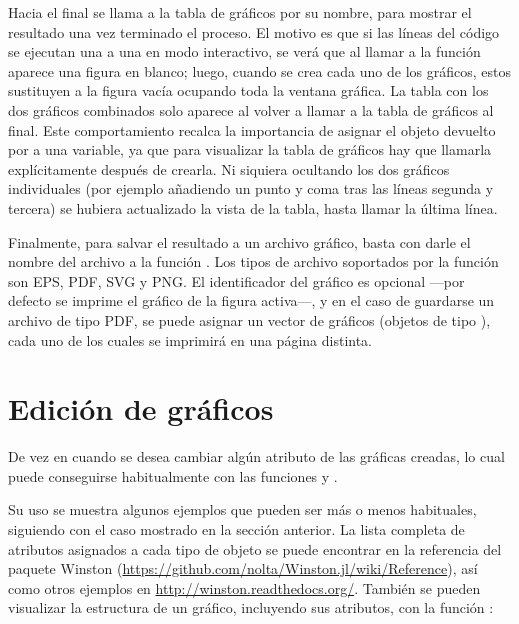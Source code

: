 Hacia el final se llama a la tabla de gráficos por su nombre, para mostrar el resultado una vez terminado el proceso. El motivo es que si las líneas del código se ejecutan una a una en modo interactivo, se verá que al llamar a la función  aparece una figura en blanco; luego, cuando se crea cada uno de los gráficos, estos sustituyen a la figura vacía ocupando toda la ventana gráfica. La tabla con los dos gráficos combinados solo aparece al volver a llamar a la tabla de gráficos al final. Este comportamiento recalca la importancia de asignar el objeto devuelto por  a una variable, ya que para visualizar la tabla de gráficos hay que llamarla explícitamente después de crearla. Ni siquiera ocultando los dos gráficos individuales (por ejemplo añadiendo un punto y coma tras las líneas segunda y tercera) se hubiera actualizado la vista de la tabla, hasta llamar la última línea.

Finalmente, para salvar el resultado a un archivo gráfico, basta con darle el nombre del archivo a la función . Los tipos de archivo soportados por la función son EPS, PDF, SVG y PNG. El identificador del gráfico es opcional ---por defecto se imprime el gráfico de la figura activa---, y en el caso de guardarse un archivo de tipo PDF, se puede asignar un vector de gráficos (objetos de tipo ), cada uno de los cuales se imprimirá en una página distinta.


\section{Edición de gráficos}

De vez en cuando se desea cambiar algún atributo de las gráficas creadas, lo cual puede conseguirse habitualmente con las funciones  y .

Su uso se muestra algunos ejemplos que pueden ser más o menos habituales, siguiendo con el caso mostrado en la sección anterior. La lista completa de atributos asignados a cada tipo de objeto se puede encontrar en la referencia del paquete Winston (\url{https://github.com/nolta/Winston.jl/wiki/Reference}), así como otros ejemplos en \url{http://winston.readthedocs.org/}. También se pueden visualizar la estructura de un gráfico, incluyendo sus atributos, con la función :

